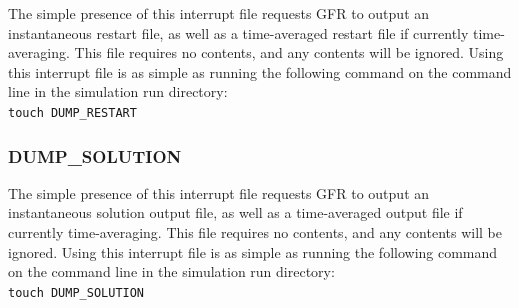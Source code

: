 The simple presence of this interrupt file requests GFR to output an
instantaneous restart file, as well as a time-averaged restart file if
currently time-averaging.
%
This file requires no contents, and any contents will be ignored.
%
Using this interrupt file is as simple as running the following command on the
command line in the simulation run directory:
%
\\[1.2ex]\indent\texttt{touch DUMP\_RESTART}


\subsubsection{DUMP\_SOLUTION}
\label{SEC:Files:Interrupt:Dump_Solution}

The simple presence of this interrupt file requests GFR to output an
instantaneous solution output file, as well as a time-averaged output file if
currently time-averaging.
%
This file requires no contents, and any contents will be ignored.
%
Using this interrupt file is as simple as running the following command on the
command line in the simulation run directory:
%
\\[1.2ex]\indent\texttt{touch DUMP\_SOLUTION}






